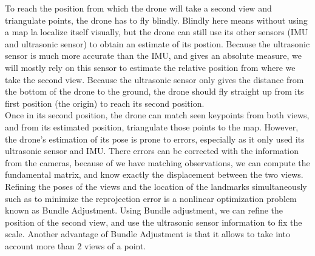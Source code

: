 To reach the position from which the drone will take a second view and triangulate points, the drone has to fly blindly. Blindly here means without using a map la localize itself visually, but the drone can still use its other sensors (IMU and ultrasonic sensor) to obtain an estimate of its postion. Because the ultrasonic sensor is much more accurate than the IMU, and gives an absolute measure, we will mostly rely on this sensor to estimate the relative position from where we take the second view. Because the ultrasonic sensor only gives the distance from the bottom of the drone to the ground, the drone should fly straight up from its first position (the origin) to reach its second position.\\
Once in its second position, the drone can match seen keypoints from both views, and from its estimated position, triangulate those points to the map. However, the drone's estimation of its pose is prone to errors, especially as it only used its ultrasonic sensor and IMU. There errors can be corrected with the information from the cameras, because of we have %
matching observations, we can compute the fundamental matrix, and know exactly the displacement between the two views. Refining the poses of the views and the location of the landmarks simultaneously such as to minimize the reprojection error is a nonlinear optimization problem known as Bundle Adjustment. Using Bundle adjustment, we can refine the position of the second view, and use the ultrasonic sensor information to fix the scale. Another advantage of Bundle Adjustment is that it allows to take into account more than 2 views of a point.
